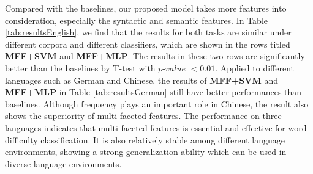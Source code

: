 Compared with the baselines, our proposed model takes more features 
into consideration, especially the syntactic and semantic features.
In Table \ref{tab:resultsEnglish}, we find that the results for both tasks are similar under different corpora and different classifiers, 
which are shown in the rows titled \textbf{MFF+SVM} and \textbf{MFF+MLP}.
The results in these two rows are significantly better than the baselines by T-test with $p$-$value$ $<0.01$.
Applied to different languages such as German and Chinese, the results of \textbf{MFF+SVM} and \textbf{MFF+MLP} in Table \ref{tab:resultsGerman} still have better performances than baselines.
Although frequency plays an important role in Chinese, the result also shows the superiority of multi-faceted features. 
The performance on three languages indicates that multi-faceted features 
is essential and effective for word difficulty classification.
It is also relatively stable among different language environments, showing a strong generalization ability which can 
be used in diverse language environments.
	


